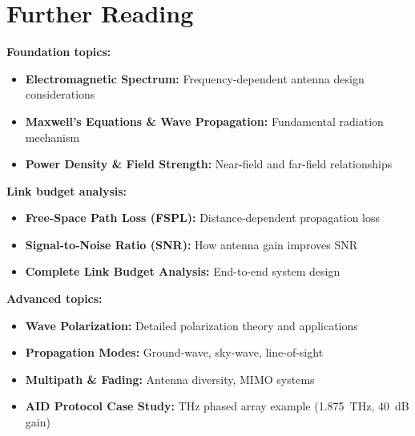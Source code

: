 \section{Further Reading}

\textbf{Foundation topics:}
\begin{itemize}
\item \textbf{Electromagnetic Spectrum:} Frequency-dependent antenna design considerations
\item \textbf{Maxwell's Equations \& Wave Propagation:} Fundamental radiation mechanism
\item \textbf{Power Density \& Field Strength:} Near-field and far-field relationships
\end{itemize}

\textbf{Link budget analysis:}
\begin{itemize}
\item \textbf{Free-Space Path Loss (FSPL):} Distance-dependent propagation loss
\item \textbf{Signal-to-Noise Ratio (SNR):} How antenna gain improves SNR
\item \textbf{Complete Link Budget Analysis:} End-to-end system design
\end{itemize}

\textbf{Advanced topics:}
\begin{itemize}
\item \textbf{Wave Polarization:} Detailed polarization theory and applications
\item \textbf{Propagation Modes:} Ground-wave, sky-wave, line-of-sight
\item \textbf{Multipath \& Fading:} Antenna diversity, MIMO systems
\item \textbf{AID Protocol Case Study:} THz phased array example (1.875~THz, 40~dB gain)
\end{itemize}
